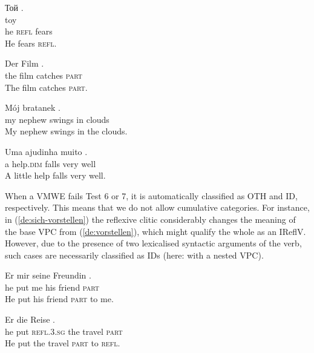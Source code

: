 \documentclass[output=paper,
modfonts,
]{langscibook}
\begin{document}
\begin{itemize}
\ea \label{bg:self-fear}
\settowidth {} 
\glll Той \underline{} .\\
toy \underline{}  \\
he \textsc{refl} fears \\ 
\glt He fears \textsc{refl}. 
\z

\ea \label{de:anfangen}
\settowidth {} 
\gll Der Film  \underline{}.\\
the film catches \textsc{part} \\ 
\glt The film catches \textsc{part}. 
\z

\ea \label{pl:bujac-w-oblokach}
\settowidth {} 
\gll Mój bratanek  \underline{} \underline{}.\\
my nephew swings in clouds \\ 
\glt My nephew swings in the clouds. 
\z

\ea \label{pt:cai-bem}
\settowidth {} 
\gll Uma ajudinha  muito \underline{}. \\
a help.\textsc{dim} falls very well \\ 
\glt A little help falls very well. 
\z

\end{itemize}

When a VMWE fails Test 6 or 7, it is automatically classified as OTH and ID, respectively. This means that we do not allow cumulative categories. For instance, in (\ref{de:sich-vorstellen})
the reflexive clitic considerably changes the meaning of the base VPC from (\ref{de:vorstellen}), 
which might qualify the whole as an IReflV. However, due to the presence of two lexicalised syntactic arguments of the verb, such cases are necessarily classified as IDs (here: with a nested VPC). 

\ea \label{de:vorstellen}
\settowidth {} 
\gll Er  mir seine Freundin .\\
he put me his friend \textsc{part} \\ 
\glt He put his friend \textsc{part} to me. 
\z

\ea \label{de:sich-vorstellen}
\settowidth {} 
\gll Er   die Reise . \\
he put \textsc{refl.3.sg} the travel \textsc{part} \\ 
\glt He put the travel \textsc{part} to \textsc{refl}. 
\z
\end{document}
